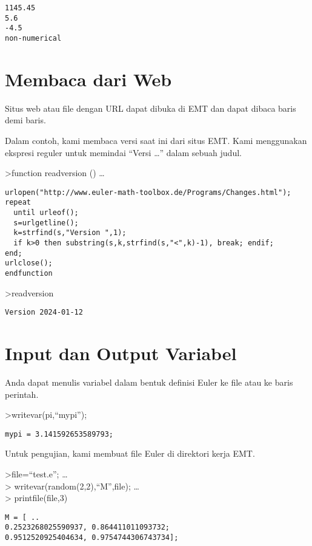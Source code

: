 \documentclass[
]{book}
\begin{document}
\begin{verbatim}
1145.45
5.6
-4.5
non-numerical
\end{verbatim}

\chapter{Membaca dari Web}\label{membaca-dari-web}

Situs web atau file dengan URL dapat dibuka di EMT dan dapat dibaca baris demi baris.

Dalam contoh, kami membaca versi saat ini dari situs EMT. Kami menggunakan ekspresi reguler untuk memindai ``Versi \ldots{}'' dalam sebuah judul.

\textgreater function readversion () \ldots{}

\begin{verbatim}
urlopen("http://www.euler-math-toolbox.de/Programs/Changes.html");
repeat
  until urleof();
  s=urlgetline();
  k=strfind(s,"Version ",1);
  if k>0 then substring(s,k,strfind(s,"<",k)-1), break; endif;
end;
urlclose();
endfunction
\end{verbatim}

\textgreater readversion

\begin{verbatim}
Version 2024-01-12
\end{verbatim}

\chapter{Input dan Output Variabel}\label{input-dan-output-variabel}

Anda dapat menulis variabel dalam bentuk definisi Euler ke file atau ke baris perintah.

\textgreater writevar(pi,``mypi'');

\begin{verbatim}
mypi = 3.141592653589793;
\end{verbatim}

Untuk pengujian, kami membuat file Euler di direktori kerja EMT.

\textgreater file=``test.e''; \ldots{}\\
\textgreater{} writevar(random(2,2),``M'',file); \ldots{}\\
\textgreater{} printfile(file,3)

\begin{verbatim}
M = [ ..
0.2523268025590937, 0.864411011093732;
0.9512520925404634, 0.9754744306743734];
\end{verbatim}
\end{document}
